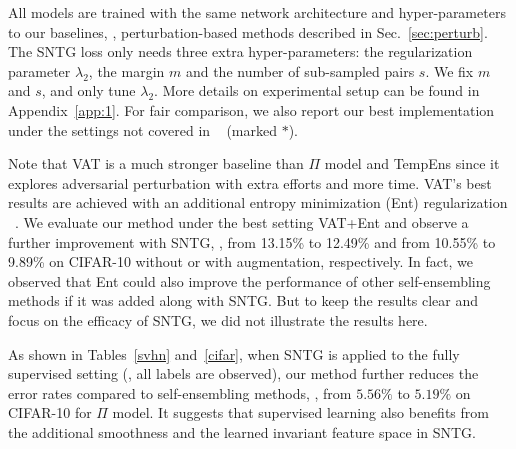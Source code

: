 \documentclass[10pt,twocolumn,letterpaper]{article}
\begin{document}
All models are trained with the same network architecture and hyper-parameters to our baselines, \ie, perturbation-based methods described in Sec.~\ref{sec:perturb}. The SNTG loss only needs three extra hyper-parameters: the regularization parameter $\lambda_2$, the margin $m$ and the number of sub-sampled pairs $s$. We fix $m$ and $s$, and only tune $\lambda_2$. More details on experimental setup can be found in Appendix~\ref{app:1}. For fair comparison, we also report our best implementation under the settings not covered in ~\cite{laine2016temporal} (marked $*$).

Note that VAT is a much stronger baseline than $\Pi$ model and TempEns since it explores adversarial perturbation with extra efforts and more time. VAT's best results are achieved with an additional entropy minimization (Ent) regularization ~\cite{grandvalet2005semi}. We evaluate our method under the best setting VAT+Ent and observe a further improvement with SNTG, \eg, from 13.15\% to 12.49\% and from 10.55\% to 9.89\% on CIFAR-10 without or with augmentation, respectively.
In fact, we observed that Ent could also improve the performance of other self-ensembling methods if it was added along with SNTG. But to keep the results clear and focus on the efficacy of SNTG, we did not illustrate the results here.

As shown in Tables~\ref{svhn} and~\ref{cifar}, when SNTG is applied to the fully supervised setting (\ie, all labels are observed), our method further reduces the error rates compared to self-ensembling methods, \eg, from $5.56\%$ to $5.19\%$ on CIFAR-10 for $\Pi$ model. It suggests that supervised learning also benefits from the additional smoothness and the learned invariant feature space in SNTG.

\begin{table}
	\caption{Error rates (\%) on MNIST without augmentation.}%
	\label{mnist}\vspace{-.2cm}
	\centering
	\vspace{-.35cm}
\end{table}
\end{document}
